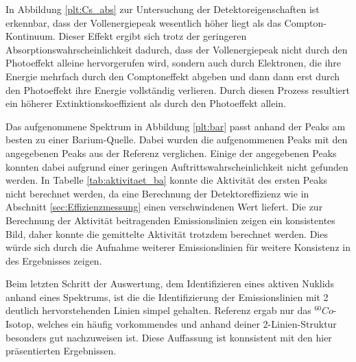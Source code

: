 In Abbildung \ref{plt:Cs_abs} zur Untersuchung der Detektoreigenschaften ist erkennbar,
dass der Vollenergiepeak wesentlich höher liegt als
das Compton-Kontinuum. Dieser Effekt ergibt sich trotz der geringeren
Absorptionswahrscheinlichkeit dadurch, dass der Vollenergiepeak nicht durch den
Photoeffekt alleine hervorgerufen wird, sondern auch durch Elektronen, die ihre
Energie mehrfach durch den Comptoneffekt abgeben und dann dann erst durch den
Photoeffekt ihre Energie vollständig verlieren. Durch diesen Prozess resultiert
ein höherer Extinktionskoeffizient als durch den Photoeffekt allein.

Das aufgenommene Spektrum in Abbildung \ref{plt:bar} passt anhand der Peaks am besten
zu einer Barium-Quelle. Dabei wurden die aufgenommenen Peaks mit den angegebenen Peaks
aus der Referenz \cite{referenz} verglichen. Einige der angegebenen Peaks konnten
dabei aufgrund einer geringen Auftrittswahrscheinlichkeit nicht gefunden werden.
In Tabelle \ref{tab:aktivitaet_ba} konnte die Aktivität des ersten Peaks nicht
berechnet werden, da eine Berechnung der Detektoreffizienz wie in Abschnitt \ref{sec:Effizienzmessung}
einen verschwindenen Wert liefert. Die zur Berechnung der Aktivität beitragenden
Emissionslinien zeigen ein konsistentes Bild, daher konnte die gemittelte Aktivität
trotzdem berechnet werden. Dies würde sich durch die Aufnahme weiterer Emissionslinien
für weitere Konsistenz in des Ergebnisses zeigen.

Beim letzten Schritt der Auswertung, dem Identifizieren eines aktiven Nuklids
anhand eines Spektrums, ist die die Identifizierung der Emissionslinien mit 2
deutlich hervorstehenden Linien simpel gehalten. Referenz \cite{referenz} ergab
nur das $^{60}Co$-Isotop, welches ein häufig vorkommendes und anhand deiner 2-Linien-Struktur
besonders gut nachzuweisen ist. Diese Auffassung ist konnsistent mit den hier
präsentierten Ergebnissen. 
